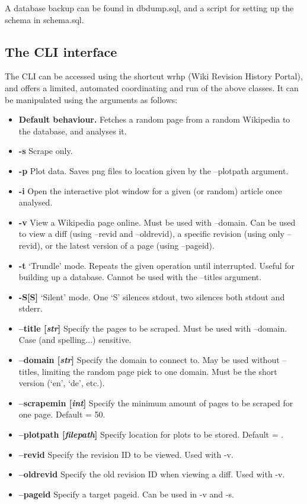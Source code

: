 A database backup can be found in dbdump.sql, and a script for setting
up the schema in schema.sql.

\clearpage

\subsection*{The CLI interface}
The CLI can be accessed using the shortcut wrhp (Wiki Revision History
Portal), and offers a limited, automated coordinating and run of
the above classes. It can be manipulated using the arguments as follows:

\begin{itemize}[label={}]
  \item \textbf{Default behaviour.} Fetches a random page from a
    random Wikipedia to the database, and analyses it.
  \item \textbf{-s} Scrape only. 
  \item \textbf{-p} Plot data. Saves png files to location given by
    the --plotpath argument.
  \item \textbf{-i} Open the interactive plot window for a given (or
    random) article once analysed.
  \item \textbf{-v} View a Wikipedia page online. Must be used with
    --domain. Can be used to view a diff (using --revid and
    --oldrevid), a specific revision (using only --revid), or the
    latest version of a page (using --pageid).
  \item \textbf{-t} `Trundle' mode. Repeats the given operation until
    interrupted. Useful for building up a database. Cannot be used
    with the --titles argument.
  \item \textbf{-S[S]} `Silent' mode. One `S' silences stdout, two
    silences both stdout and stderr.
  \item \textbf{--title [\textit{str}]} Specify the
    pages to be scraped. Must be used with --domain. Case (and
    spelling...)  sensitive.
  \item \textbf{--domain [\textit{str}]} Specify the domain to connect
    to. May be used without --titles, limiting the random page pick to
    one domain. Must be the short version (`en', `de', etc.).
  \item \textbf{--scrapemin [\textit{int}]} Specify the minimum amount of
    pages to be scraped for one page. Default = 50.
  \item \textbf{--plotpath [\textit{filepath}]} Specify location for
    plots to be stored. Default = .
  \item \textbf{--revid} Specify the revision ID to be viewed. Used
    with -v.
  \item \textbf{--oldrevid} Specify the old revision ID when viewing a
    diff. Used with -v.
  \item \textbf{--pageid} Specify a target pageid. Can be used in -v
    and -s.
\end{itemize}
